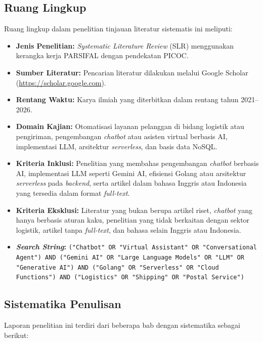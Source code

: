 \subsection{Ruang Lingkup}

Ruang lingkup dalam penelitian tinjauan literatur sistematis ini meliputi:

\begin{itemize}[leftmargin=*]
    \item \textbf{Jenis Penelitian:} \textit{Systematic Literature Review} (SLR) menggunakan kerangka kerja PARSIFAL dengan pendekatan PICOC.
    \item \textbf{Sumber Literatur:} Pencarian literatur dilakukan melalui Google Scholar (\url{https://scholar.google.com}).
    \item \textbf{Rentang Waktu:} Karya ilmiah yang diterbitkan dalam rentang tahun 2021--2026.
    \item \textbf{Domain Kajian:} Otomatisasi layanan pelanggan di bidang logistik atau pengiriman, pengembangan \textit{chatbot} atau asisten virtual berbasis AI, implementasi LLM, arsitektur \textit{serverless}, dan basis data NoSQL.
    \item \textbf{Kriteria Inklusi:} Penelitian yang membahas pengembangan \textit{chatbot} berbasis AI, implementasi LLM seperti Gemini AI, efisiensi Golang atau arsitektur \textit{serverless} pada \textit{backend}, serta artikel dalam bahasa Inggris atau Indonesia yang tersedia dalam format \textit{full-text}.
    \item \textbf{Kriteria Eksklusi:} Literatur yang bukan berupa artikel riset, \textit{chatbot} yang hanya berbasis aturan kaku, penelitian yang tidak berkaitan dengan sektor logistik, artikel tanpa \textit{full-text}, dan bahasa selain Inggris atau Indonesia.
    \item \textbf{\textit{Search String}:} \texttt{("Chatbot" OR "Virtual Assistant" OR "Conversational Agent") AND ("Gemini AI" OR "Large Language Models" OR "LLM" OR "Generative AI") AND ("Golang" OR "Serverless" OR "Cloud Functions") AND ("Logistics" OR "Shipping" OR "Postal Service")}
\end{itemize}

\subsection{Sistematika Penulisan}

Laporan penelitian ini terdiri dari beberapa bab dengan sistematika sebagai berikut:

